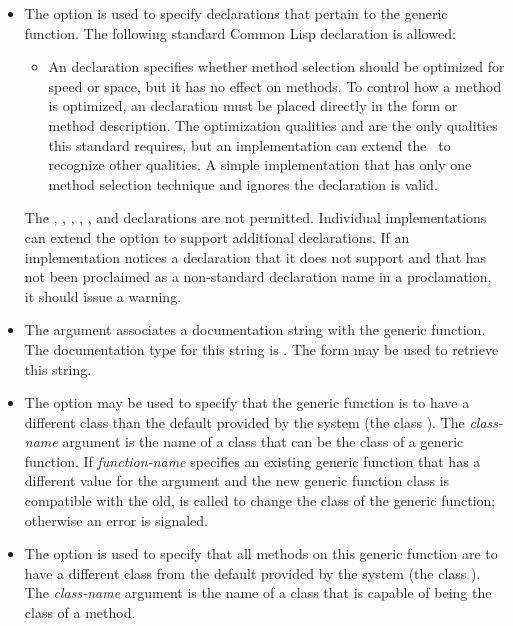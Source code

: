 \begin{defmac}
\begin{itemize}
\item 
The  option is used to specify declarations that pertain
to the generic function.  The following standard Common Lisp
declaration is allowed:

\begin{itemize}
\item
An  declaration specifies whether method selection
should be optimized for speed or space, but it has no effect on
methods.  To control how a method is optimized, an 
declaration must be placed directly in the  form or
method description.  The optimization qualities  and 
 are the only qualities this standard requires, but an
implementation can extend the \CLOS\ to recognize other qualities.  A
simple implementation that has only one method selection technique and
ignores the  declaration is valid.
\end{itemize}

The , , , , 
, and  declarations are not permitted.
Individual implementations can extend the  option to
support additional declarations.  If an implementation notices a
declaration that it does not support and that has not been proclaimed
as a non-standard declaration name in a  proclamation, it
should issue a warning.

\item  
The  argument associates a documentation string
with the generic function.  The documentation type for this string is
.  The form 
may be used to retrieve this 
string.

\item  
The  option may be used to specify that
the generic function is to have a different class than the default
provided by the system (the class ).
The \emph{class-name} argument is the name of a class that can be the
class of a generic function.  If \emph{function-name} specifies
an existing generic function that has a different value for the 
 argument and the new generic function class
is compatible with the old,  is called to change the
class of the generic function; otherwise an error is signaled.

\item  
The  option is used to specify that all methods on
this generic function are to have a different class from the default
provided by the system (the class ).  The \emph{class-name}
argument is the name of a class that is capable of being 
the class of a method.


\end{itemize}
\end{defmac}
